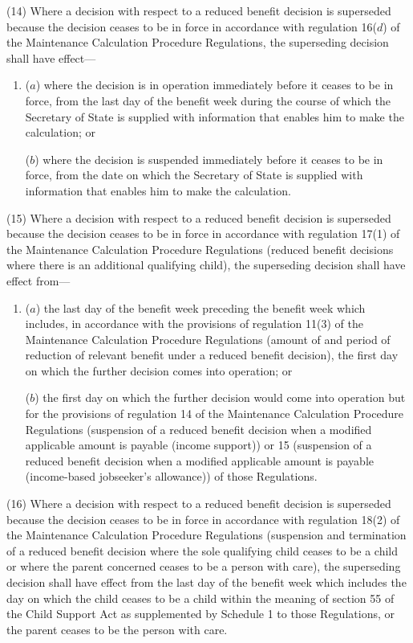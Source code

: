 \documentclass[12pt,a4paper]{article}
\begin{document}
{(14) Where a decision with respect to a reduced benefit decision is superseded because the decision ceases to be in force in accordance with regulation 16($d$)  of the Maintenance Calculation Procedure Regulations, the superseding decision shall have effect—
\begin{enumerate}\item[]
($a$) where the decision is in operation immediately before it ceases to be in force, from the last day of the benefit week during the course of which the Secretary of State is supplied with information that enables him to make the calculation; or

($b$) where the decision is suspended immediately before it ceases to be in force, from the date on which the Secretary of State is supplied with information that enables him to make the calculation.
\end{enumerate}

(15) Where a decision with respect to a reduced benefit decision is superseded because the decision ceases to be in force in accordance with regulation 17(1) of the Maintenance Calculation Procedure Regulations (reduced benefit decisions where there is an additional qualifying child), the superseding decision shall have effect from—
\begin{enumerate}\item[]
($a$) the last day of the benefit week preceding the benefit week which includes, in accordance with the provisions of regulation 11(3) of the Maintenance Calculation Procedure Regulations (amount of and period of reduction of relevant benefit under a reduced benefit decision), the first day on which the further decision comes into operation; or

($b$) the first day on which the further decision would come into operation but for the provisions of regulation 14 of the Maintenance Calculation Procedure Regulations (suspension of a reduced benefit decision when a modified applicable amount is payable (income support)) or 15 (suspension of a reduced benefit decision when a modified applicable amount is payable (income-based jobseeker’s allowance)) of those Regulations.
\end{enumerate}

(16) Where a decision with respect to a reduced benefit decision is superseded because the decision ceases to be in force in accordance with regulation 18(2) of the Maintenance Calculation Procedure Regulations (suspension and termination of a reduced benefit decision where the sole qualifying child ceases to be a child or where the parent concerned ceases to be a person with care), the superseding decision shall have effect from the last day of the benefit week which includes the day on which the child ceases to be a child within the meaning of section 55 of the Child Support Act as supplemented by Schedule 1 to those Regulations, or the parent ceases to be the person with care.

}
\end{document}
